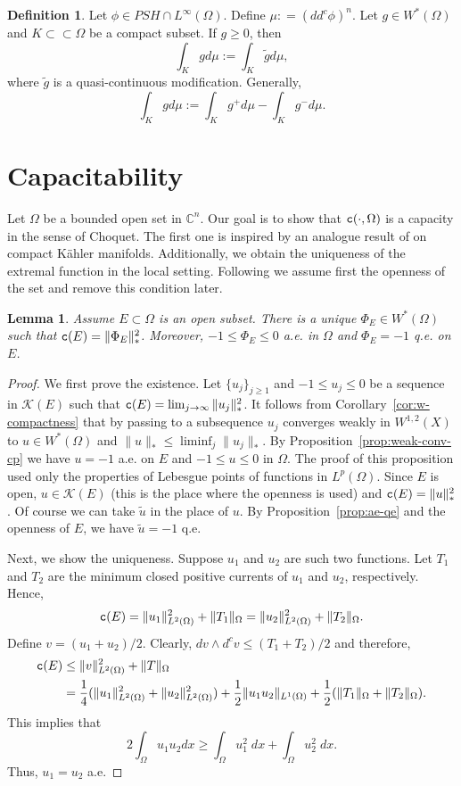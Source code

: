 \documentclass{amsart}
\newcommand{\wt}[1]{\widetilde{#1}}
\newcommand{\tc}{{\tt c}}
\newcommand{\Om}{\Omega}
\newcommand{\bC}{\mathbb{C}}
\newcommand{\cali}[1]{\mathscr{#1}}
\newcommand{\Kc}{\cali{K}}
\newtheorem{lem}[thm]{Lemma}
\theoremstyle{definition}
\newtheorem{defn}[thm]{Definition}
\numberwithin{thm}{section}
\numberwithin{equation}{section}
\renewcommand{\[}{\begin{equation}}
\renewcommand{\]}{\end{equation}}
\newcommand{\wed}{\wedge}
\begin{document}
\begin{defn}
\label{defn:L2-ma} Let $\phi \in PSH\cap L^\infty(\Om)$.
Define $\mu: = (dd^c\phi)^n$. Let $g \in W^*(\Om)$ and $K \subset \subset \Om$ be a compact subset.  If $g\geq 0$, then
$$
	\int_K g d\mu := \int_K \wt g d\mu,
$$
where $\wt g$ is a quasi-continuous modification. 
Generally, 
$$
	\int_K g d\mu := \int_K g^+ d\mu - \int_K g^- d\mu.
$$
\end{defn}


\section{Capacitability}

Let $\Om$ be a bounded open set in $\bC^n$. Our goal is to show that $\tc(\cdot, \Om)$ is a capacity in the sense of Choquet.  The first one is inspired by  an analogue result of \cite[Corollary~31]{Vigny} on compact K\"ahler manifolds. Additionally, we obtain the uniqueness of the extremal function in the local setting. Following \cite[Lemma~2.1.1]{FO87} we assume first the openness of the set and remove this condition later. 

\begin{lem} \label{lem:extr-funciton-o} Assume $E\subset\Om$ is an open subset. There is a unique $\Phi_E \in W^*(\Om)$ such that 
$\tc (E) = \|\Phi_E\|_*^2$. Moreover, $-1\leq \Phi_E \leq 0$ a.e. in $\Om$ and $\Phi_E=-1$ q.e. on $E$.
\end{lem}

\begin{proof} We first prove the existence. Let $\{u_j\}_{j\geq 1}$ and $-1\leq u_j \leq 0$ be a sequence in $\Kc(E)$ such that $\tc(E) = \lim_{j\to \infty} \|u_j\|_*^2$. It follows from Corollary~\ref{cor:w-compactness} that by passing to a subsequence $u_j$ converges weakly in $W^{1,2}(X)$ to  $u \in W^*(\Om)$ and $\|u\|_* \leq \liminf_j \|u_j\|_*$.  By Proposition~\ref{prop:weak-conv-cp} we have $u =-1$ a.e. on $E$ and $-1\leq u\leq 0$ in $\Om$.  The proof of this proposition used only the properties of Lebesgue points of functions in $L^p(\Om)$. Since $E$ is open,  $u\in \Kc(E)$ (this is the place where the openness is used) and $\tc(E) = \|u\|_*^2$. Of course we can take $\wt u$ in the place of $u$.  By Proposition~\ref{prop:ae-qe} and the openness of $E$, we have $\wt u = -1$ q.e. 

Next,  we show the uniqueness. Suppose $u_1$ and $u_2$ are such two functions. Let $T_1$ and $T_2$ are the minimum closed positive currents of $u_1$ and $u_2$, respectively. Hence,
$$
	\tc(E) = \|u_1\|_{L^2(\Om)}^2 + \|T_1\|_\Om = \|u_2\|_{L^2(\Om)}^2 + \|T_2\|_\Om.
$$  
Define $v = (u_1+u_2)/2$. Clearly, 
$
	dv \wed d^c v \leq (T_1 +T_2)/2
$
and therefore, 
$$\begin{aligned}
	\tc(E) &\leq \|v\|_{L^2(\Om)}^2 + \|T\|_\Om \\&=\frac{1}{4} (\|u_1\|_{L^2(\Om)}^2 + \| u_2\|_{L^2(\Om)}^2) + \frac{1}{2} \|u_1u_2\|_{L^1(\Om)} + \frac{1}{2} (\|T_1\|_\Om + \|T_2\|_\Om).
\end{aligned}$$
This implies that 
$$
	2\int_\Om u_1 u_2  dx \geq \int_\Om u_1^2 \;dx + \int_\Om u_2^2 \; dx.
$$
Thus, $u_1 = u_2$ a.e. 
\end{proof}
\end{document}
